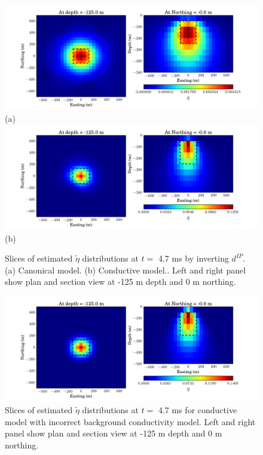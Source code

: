 \documentclass[a4paper, 11pt]{article}
\newcommand{\peta}{\tilde{\eta}}
\begin{document}
\begin{figure}[htb]
  \centering
  \includegraphics[width=\textwidth]{figures/synthetic/PetaCase1_true_ch38.png}\\
  (a)
  \includegraphics[width=\textwidth]{figures/synthetic/PetaCase2_true_ch38.png}\\
  (b)
  \caption{Slices of estimated $\peta$ distributions at $t = $ 4.7 ms  by inverting $d^{IP}$. (a) Canonical model. (b)  Conductive model.. Left and right panel show plan and section view at -125 m depth and 0 m northing. }
  \label{F: Peta_dip_ch38}
\end{figure}

\begin{figure}[htb]
  \centering
  \includegraphics[width=\textwidth]{figures/synthetic/PetaCase2_wrong_ch38.png}
  \caption{Slices of estimated $\peta$ distributions at $t = $ 4.7 ms for conductive model with incorrect background conductivity model. Left and right panel show plan and section view at -125 m depth and 0 m northing. }
  \label{F: Peta_case2_wrong_ch38}
\end{figure}
\end{document}
